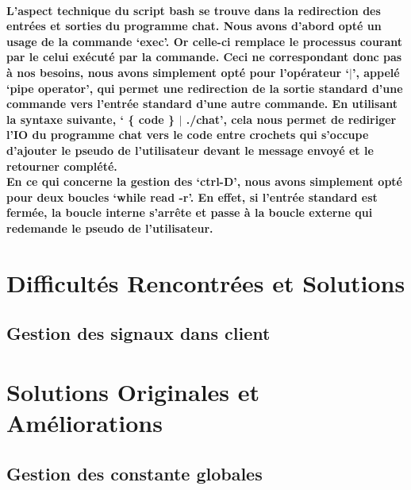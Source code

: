 \documentclass[utf8]{article}
\begin{document}
\paragraph{L'aspect technique du script bash se trouve dans la redirection des entrées et sorties du programme chat. Nous avons d'abord opté un usage de la commande `exec'. Or celle-ci remplace le processus courant
par le celui exécuté par la commande. Ceci ne correspondant donc pas à nos besoins, nous avons simplement opté pour l'opérateur `$|$', appelé `pipe operator', qui permet une redirection de la sortie standard d'une 
commande vers l'entrée standard d'une autre commande. En utilisant la syntaxe suivante, ` \{ code \} $|$ ./chat', cela nous permet de rediriger l'IO du programme chat vers le code entre crochets qui s'occupe
d'ajouter le pseudo de l'utilisateur devant le message envoyé et le retourner complété. \\
En ce qui concerne la gestion des `ctrl-D', nous avons simplement opté pour deux boucles `while read -r'. En effet, si l'entrée standard est fermée, la boucle interne s'arrête et passe à la boucle externe qui
redemande le pseudo de l'utilisateur.} %

\section{Difficultés Rencontrées et Solutions}
\subsection{Gestion des signaux dans client}
\paragraph{}

\section{Solutions Originales et Améliorations}
\subsection{Gestion des constante globales}
\end{document}

